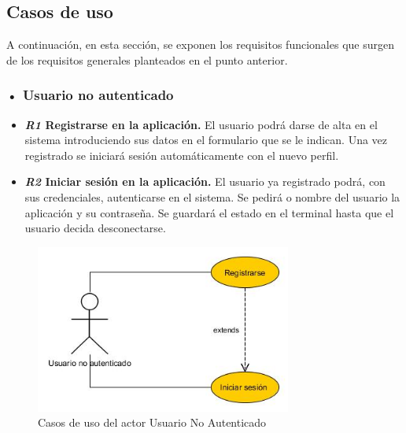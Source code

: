\subsection{Casos de uso}
A continuación, en esta sección, se exponen los requisitos funcionales que surgen de los requisitos generales planteados en el punto anterior.
\subsubsection{• Usuario no autenticado}
\begin{itemize}
\item\textbf{ \textit{R1}  Registrarse en la aplicación.}
 El usuario podrá darse de alta en el sistema
introduciendo sus datos en el formulario que se le indican. Una vez registrado se iniciará sesión
automáticamente con el nuevo perfil.

\item \textbf{\textit{R2} Iniciar sesión en la aplicación. }
El usuario ya registrado podrá, con
sus credenciales, autenticarse en el  sistema. Se pedirá o nombre del usuario la aplicación y  su contraseña. Se guardará el estado en el terminal hasta que el usuario decida desconectarse.
\end{itemize} 
\begin{figure}[H]
		\centering
		\includegraphics[width=0.75\textwidth] {usuario-no-autenticado.jpg}
		\caption{Casos de uso del actor Usuario No Autenticado }
	\end{figure}
